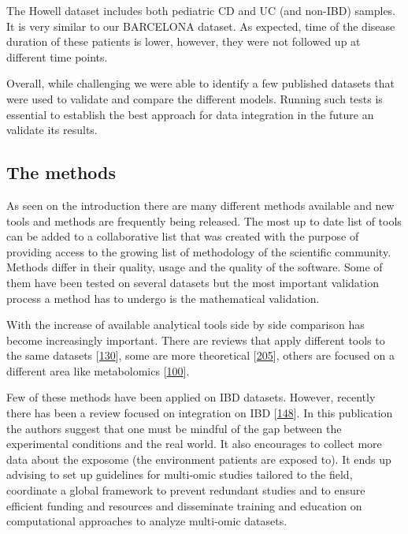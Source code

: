 \documentclass[
  12pt,
  a4paper,
  twoside,
  openright]{book}
\begin{document}
The Howell dataset includes both pediatric CD and UC (and non-IBD) samples.
It is very similar to our BARCELONA dataset.
As expected, time of the disease duration of these patients is lower, however, they were not followed up at different time points.

Overall, while challenging we were able to identify a few published datasets that were used to validate and compare the different models.
Running such tests is essential to establish the best approach for data integration in the future an validate its results.

\hypertarget{the-methods}{%
\subsection{The methods}\label{the-methods}}

As seen on the introduction there are many different methods available and new tools and methods are frequently being released.
The most up to date list of tools can be added to a collaborative list that was created with the purpose of providing access to the growing list of methodology of the scientific community.
Methods differ in their quality, usage and the quality of the software.
Some of them have been tested on several datasets but the most important validation process a method has to undergo is the mathematical validation.

With the increase of available analytical tools side by side comparison has become increasingly important.
There are reviews that apply different tools to the same datasets {[}\protect\hyperlink{ref-cantini2021}{130}{]}, some are more theoretical {[}\protect\hyperlink{ref-bersanelli2016}{205}{]}, others are focused on a different area like metabolomics {[}\protect\hyperlink{ref-cavill2016}{100}{]}.

Few of these methods have been applied on IBD datasets.
However, recently there has been a review focused on integration on IBD {[}\protect\hyperlink{ref-sudhakar2022}{148}{]}.
In this publication the authors suggest that one must be mindful of the gap between the experimental conditions and the real world.
It also encourages to collect more data about the exposome (the environment patients are exposed to).
It ends up advising to set up guidelines for multi-omic studies tailored to the field, coordinate a global framework to prevent redundant studies and to ensure efficient funding and resources and disseminate training and education on computational approaches to analyze multi-omic datasets.
\end{document}
